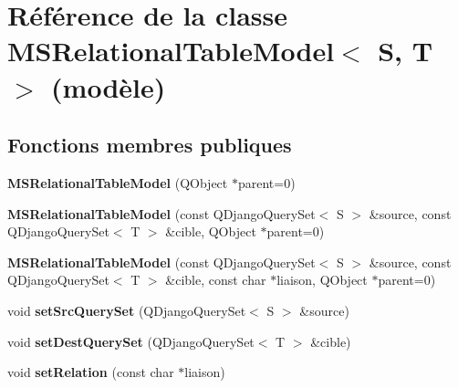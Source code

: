 \hypertarget{class_m_s_relational_table_model}{
\section{Référence de la classe MSRelationalTableModel$<$ S, T $>$ (modèle)}
\label{d4/d40/class_m_s_relational_table_model}
}
\subsection*{Fonctions membres publiques}
\begin{DoxyCompactItemize}
\item 
\hypertarget{class_m_s_relational_table_model_ac620e09ee48862189f3b69929ae395f4}{
{\bfseries MSRelationalTableModel} (QObject $\ast$parent=0)}
\label{d4/d40/class_m_s_relational_table_model_ac620e09ee48862189f3b69929ae395f4}

\item 
\hypertarget{class_m_s_relational_table_model_a61d02377ff167732f20130ba93809eb3}{
{\bfseries MSRelationalTableModel} (const QDjangoQuerySet$<$ S $>$ \&source, const QDjangoQuerySet$<$ T $>$ \&cible, QObject $\ast$parent=0)}
\label{d4/d40/class_m_s_relational_table_model_a61d02377ff167732f20130ba93809eb3}

\item 
\hypertarget{class_m_s_relational_table_model_a5429b24d5b56800a12aee682be513e02}{
{\bfseries MSRelationalTableModel} (const QDjangoQuerySet$<$ S $>$ \&source, const QDjangoQuerySet$<$ T $>$ \&cible, const char $\ast$liaison, QObject $\ast$parent=0)}
\label{d4/d40/class_m_s_relational_table_model_a5429b24d5b56800a12aee682be513e02}

\item 
\hypertarget{class_m_s_relational_table_model_a185615eeb111a5ae8c0ee0225173b315}{
void {\bfseries setSrcQuerySet} (QDjangoQuerySet$<$ S $>$ \&source)}
\label{d4/d40/class_m_s_relational_table_model_a185615eeb111a5ae8c0ee0225173b315}

\item 
\hypertarget{class_m_s_relational_table_model_a5a0865f228edf6036703263d5a3e8f52}{
void {\bfseries setDestQuerySet} (QDjangoQuerySet$<$ T $>$ \&cible)}
\label{d4/d40/class_m_s_relational_table_model_a5a0865f228edf6036703263d5a3e8f52}

\item 
\hypertarget{class_m_s_relational_table_model_ae2026ba19704d17d6d9400c29ab69a45}{
void {\bfseries setRelation} (const char $\ast$liaison)}
\label{d4/d40/class_m_s_relational_table_model_ae2026ba19704d17d6d9400c29ab69a45}


\end{DoxyCompactItemize}
